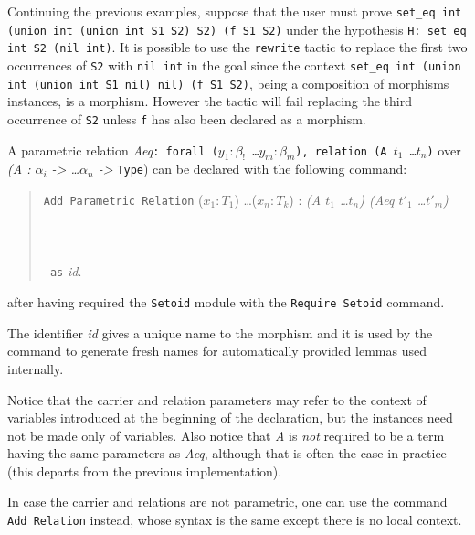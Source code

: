 \begin{cscexample}[Rewriting]
Continuing the previous examples, suppose that the user must prove
\texttt{set\_eq int (union int (union int S1 S2) S2) (f S1 S2)} under the
hypothesis \texttt{H: set\_eq int S2 (nil int)}. It is possible to
use the \texttt{rewrite} tactic to replace the first two occurrences of
\texttt{S2} with \texttt{nil int} in the goal since the context
\texttt{set\_eq int (union int (union int S1 nil) nil) (f S1 S2)}, being
a composition of morphisms instances, is a morphism. However the tactic
will fail replacing the third occurrence of \texttt{S2} unless \texttt{f}
has also been declared as a morphism.
\end{cscexample}

A parametric relation
\textit{Aeq}\texttt{: forall ($y_1 : \beta_!$ \ldots $y_m : \beta_m$), relation (A $t_1$ \ldots $t_n$)} over
\textit{(A : $\alpha_i$ -> \ldots $\alpha_n$ -> }\texttt{Type})
can be declared with the following command:

\begin{quote}
  \texttt{Add Parametric Relation} ($x_1 : T_1$) \ldots ($x_n : T_k$) :
  \textit{(A $t_1$ \ldots $t_n$) (Aeq $t'_1$ \ldots $t'_m$)}\\
  ~\\
  ~\\
  ~\\
  \texttt{~as} \textit{id}.
\end{quote}
after having required the \texttt{Setoid} module with the
\texttt{Require Setoid} command.

The identifier \textit{id} gives a unique name to the morphism and it is
used by the command to generate fresh names for automatically provided lemmas
used internally.

Notice that the carrier and relation parameters may refer to the context 
of variables introduced at the beginning of the declaration, but the
instances need not be made only of variables.
Also notice that \textit{A} is \emph{not} required to be a term
having the same parameters as \textit{Aeq}, although that is often the
case in practice (this departs from the previous implementation).

In case the carrier and relations are not parametric, one can use the
command \texttt{Add Relation} instead, whose syntax is the same except
there is no local context.

